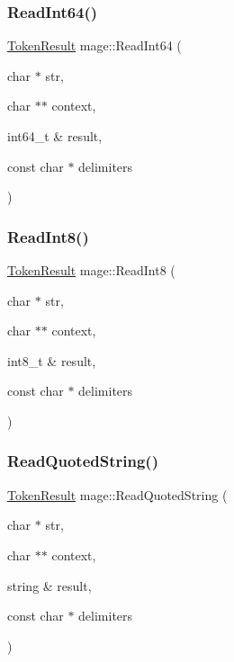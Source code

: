 \hypertarget{namespacemage_aba0fbc26edf53c3ad92f954adca8e86d}{}\label{namespacemage_aba0fbc26edf53c3ad92f954adca8e86d} 
\subsubsection{\texorpdfstring{Read\+Int64()}{ReadInt64()}}
{\footnotesize\ttfamily \hyperlink{namespacemage_a2178ba2411db5912f41b2e7698c2037d}{Token\+Result} mage\+::\+Read\+Int64 (\begin{DoxyParamCaption}\item[{char $\ast$}]{str,  }\item[{char $\ast$$\ast$}]{context,  }\item[{int64\+\_\+t \&}]{result,  }\item[{const char $\ast$}]{delimiters }\end{DoxyParamCaption})}

\hypertarget{namespacemage_a53968b4c1082fa6042a1278a1fb628d1}{}\label{namespacemage_a53968b4c1082fa6042a1278a1fb628d1} 
\subsubsection{\texorpdfstring{Read\+Int8()}{ReadInt8()}}
{\footnotesize\ttfamily \hyperlink{namespacemage_a2178ba2411db5912f41b2e7698c2037d}{Token\+Result} mage\+::\+Read\+Int8 (\begin{DoxyParamCaption}\item[{char $\ast$}]{str,  }\item[{char $\ast$$\ast$}]{context,  }\item[{int8\+\_\+t \&}]{result,  }\item[{const char $\ast$}]{delimiters }\end{DoxyParamCaption})}

\hypertarget{namespacemage_a0d98db3ab52b137bc811727c68659329}{}\label{namespacemage_a0d98db3ab52b137bc811727c68659329} 
\subsubsection{\texorpdfstring{Read\+Quoted\+String()}{ReadQuotedString()}}
{\footnotesize\ttfamily \hyperlink{namespacemage_a2178ba2411db5912f41b2e7698c2037d}{Token\+Result} mage\+::\+Read\+Quoted\+String (\begin{DoxyParamCaption}\item[{char $\ast$}]{str,  }\item[{char $\ast$$\ast$}]{context,  }\item[{string \&}]{result,  }\item[{const char $\ast$}]{delimiters }\end{DoxyParamCaption})}

